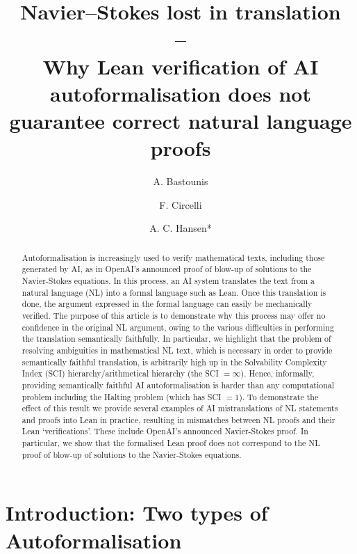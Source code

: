\documentclass[10pt, a4paper, reqno]{amsart}
\title[Why Lean verification does not guarantee faithful AI autoformalisation]{Navier--Stokes lost in translation \\ -- \\
Why Lean verification of AI autoformalisation does not guarantee correct natural language proofs}
\author{A. Bastounis}
\author{F. Circelli}
\author{A. C. Hansen*}
\numberwithin{equation}{section}
\theoremstyle{definition}
\theoremstyle{definition}
\begin{document}






\maketitle


\vspace{-4mm}




\begin{abstract}
Autoformalisation is increasingly used to verify mathematical texts, including those generated by AI, as in OpenAI's announced proof of blow-up of solutions to the Navier-Stokes equations. In this process, an AI system translates the text from a natural language (NL) into a formal language such as Lean. Once this translation is done, the argument expressed in the formal language can easily be mechanically verified. The purpose of this article is to demonstrate why this process may offer no confidence in the original NL argument, owing to the various difficulties in performing the translation semantically faithfully. In particular, we highlight that the problem of resolving ambiguities in mathematical NL text, which is necessary in order to provide semantically faithful translation, is arbitrarily high up in the Solvability Complexity Index (SCI) hierarchy/arithmetical hierarchy (the SCI $= \infty$). Hence, informally, providing semantically faithful AI autoformalisation is harder than any computational problem including the Halting problem (which has SCI $= 1$).  To demonstrate the effect of this result  we provide several examples of AI mistranslations of NL statements and proofs into Lean in practice, resulting in mismatches between NL proofs and their Lean `verifications'. These include OpenAI's announced Navier-Stokes proof. In particular, we show that the formalised Lean proof does not correspond to the NL proof of blow-up of solutions to the Navier-Stokes equations. 
\end{abstract}




\section{Introduction: Two types of Autoformalisation}\label{sec:Intro}
\end{document}
